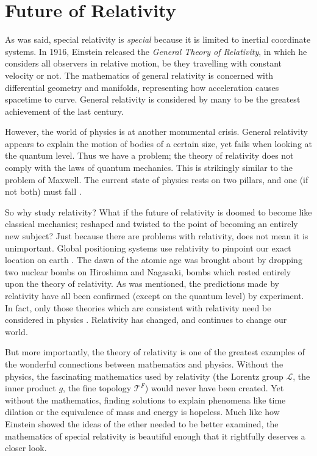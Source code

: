 \documentclass[12pt]{article}
\theoremstyle{defn}
\theoremstyle{pf}
\newcommand{\0}{\emptyset}
\renewcommand{\-}{\setminus}
\begin{document}
\section{Future of Relativity}
As was said, special relativity is \textit{special} because it is limited to inertial coordinate systems. In 1916, Einstein released the \textit{General Theory of Relativity}, in which he considers all observers in relative motion, be they travelling with constant velocity or not. The mathematics of general relativity is concerned with differential geometry and manifolds, representing how acceleration causes spacetime to curve. General relativity is considered by many to be the greatest achievement of the last century.

However, the world of physics is at another monumental crisis. General relativity appears to explain the motion of bodies of a certain size, yet fails when looking at the quantum level. Thus we have a problem; the theory of relativity does not comply with the laws of quantum mechanics. This is strikingly similar to the problem of Maxwell. The current state of physics rests on two pillars, and one (if not both) must fall \cite{hawking}. 

So why study relativity? What if the future of relativity is doomed to become like classical mechanics; reshaped and twisted to the point of becoming an entirely new subject? Just because there are problems with relativity, does not mean it is unimportant. Global positioning systems use relativity to pinpoint our exact location on earth \cite{kaku}. The dawn of the atomic age was brought about by dropping two nuclear bombs on Hiroshima and Nagasaki, bombs which rested entirely upon the theory of relativity. As was mentioned, the predictions made by relativity have all been confirmed (except on the quantum level) by experiment. In fact, only those theories which are consistent with relativity 
need be considered in physics \cite{jackson}. Relativity has changed, and continues to change our world. 

But more importantly, the theory of relativity is one of the greatest examples of the wonderful connections between mathematics and physics. Without the physics, the fascinating mathematics used by relativity (the Lorentz group $\mathcal{L}$, the inner product $g$, the fine topology $\mathcal{T}^F$) would never have been created. Yet without the mathematics, finding solutions to explain phenomena like time dilation or the equivalence of mass and energy is hopeless. Much like how Einstein showed the ideas of the ether needed to be better examined, the mathematics of special relativity is beautiful enough that it rightfully deserves a closer look.

\newpage

    
\end{document}
